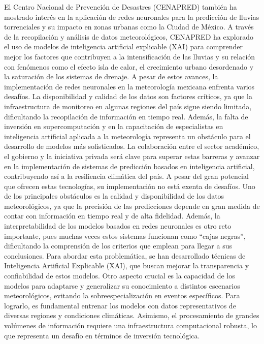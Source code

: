 \documentclass{article}
\begin{document}
El Centro Nacional de Prevención de Desastres (CENAPRED) también ha mostrado interés en la aplicación de redes neuronales para la predicción de lluvias torrenciales y su impacto en zonas urbanas como la Ciudad de México. A través de la recopilación y análisis de datos meteorológicos, CENAPRED ha explorado el uso de modelos de inteligencia artificial explicable (XAI) para comprender mejor los factores que contribuyen a la intensificación de las lluvias y su relación con fenómenos como el efecto isla de calor, el crecimiento urbano desordenado y la saturación de los sistemas de drenaje.
A pesar de estos avances, la implementación de redes neuronales en la meteorología mexicana enfrenta varios desafíos. La disponibilidad y calidad de los datos son factores críticos, ya que la infraestructura de monitoreo en algunas regiones del país sigue siendo limitada, dificultando la recopilación de información en tiempo real. Además, la falta de inversión en supercomputación y en la capacitación de especialistas en inteligencia artificial aplicada a la meteorología representa un obstáculo para el desarrollo de modelos más sofisticados. La colaboración entre el sector académico, el gobierno y la iniciativa privada será clave para superar estas barreras y avanzar en la implementación de sistemas de predicción basados en inteligencia artificial, contribuyendo así a la resiliencia climática del país.
A pesar del gran potencial que ofrecen estas tecnologías, su implementación no está exenta de desafíos. Uno de los principales obstáculos es la calidad y disponibilidad de los datos meteorológicos, ya que la precisión de las predicciones depende en gran medida de contar con información en tiempo real y de alta fidelidad. Además, la interpretabilidad de los modelos basados en redes neuronales es otro reto importante, pues muchas veces estos sistemas funcionan como “cajas negras”, dificultando la comprensión de los criterios que emplean para llegar a sus conclusiones. Para abordar esta problemática, se han desarrollado técnicas de Inteligencia Artificial Explicable (XAI), que buscan mejorar la transparencia y confiabilidad de estos modelos.
Otro aspecto crucial es la capacidad de los modelos para adaptarse y generalizar su conocimiento a distintos escenarios meteorológicos, evitando la sobreespecialización en eventos específicos. Para lograrlo, es fundamental entrenar los modelos con datos representativos de diversas regiones y condiciones climáticas. Asimismo, el procesamiento de grandes volúmenes de información requiere una infraestructura computacional robusta, lo que representa un desafío en términos de inversión tecnológica.
\end{document}
